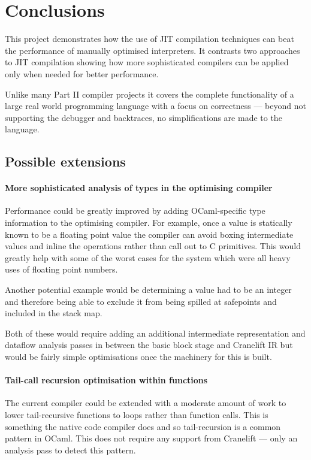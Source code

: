 \chapter{Conclusions}

This project demonstrates how the use of JIT compilation techniques can beat the performance
of manually optimised interpreters. It contrasts two approaches to JIT compilation showing how
more sophisticated compilers can be applied only when needed for better performance.

Unlike many Part II compiler projects it covers the complete functionality of a large real world
programming language with a focus on correctness --- beyond not supporting the debugger and
backtraces,
no simplifications are made to the language.

\section{Possible extensions}

\subsubsection{More sophisticated analysis of types in the optimising compiler}

Performance could be greatly improved by adding OCaml-specific type information to the optimising
compiler. For example, once a value is statically known to be a floating point value the compiler
can avoid boxing intermediate values and inline the operations rather than call out to C
primitives.
This would greatly help with some of the worst cases for the system which were all heavy uses of
floating point numbers.

Another potential example would be determining a value had to be an integer and therefore being
able to exclude it
from being spilled at safepoints and included in the stack map.

Both of these would require adding an additional intermediate representation and dataflow analysis
passes in between the basic block stage and Cranelift IR but would be fairly simple optimisations
once
the machinery for this is built.

\subsubsection{Tail-call recursion optimisation within functions}

The current compiler could be extended with a moderate amount of work to lower tail-recursive
functions to loops rather than function calls. This is something the native code compiler does and
so tail-recursion is a common pattern in OCaml. This does not require any support from Cranelift
--- only an analysis pass to detect this pattern.

